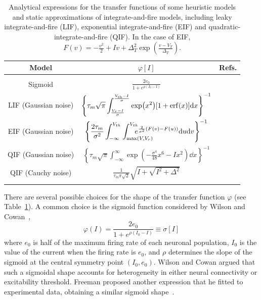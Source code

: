 \documentclass[11pt]{article}
\numberwithin{equation}{section}
\begin{document}
\begin{table}\label{table1} \small
\centering
\begingroup
{}              %
\setlength{\arrayrulewidth}{0.4pt}  %
\begin{tabular}{|c|c|c|} \hline
  \rowcolor{softblue!25}
  \textbf{\color{softblue!60!black} Model} &
  \textbf{\color{softblue!60!black} $\varphi[I]$} &
  \textbf{\color{softblue!60!black} Refs.} \\
  \hline
  & & \\  %
  Sigmoid & $\displaystyle{\frac{2e_0}{1+e^{\rho(I_0-I)}}}$ & \cite{Wilson1972,jansen1995}\\[15pt]
  LIF (Gaussian noise) & $\left\{\displaystyle{\tau_m\sqrt{\pi} \int_\frac{V_r-I}{\sigma}^\frac{V_\text{th}-I}{\sigma} \exp(x^2)[1+\erf(x)]\dd x}\right\}^{-1}$ & \cite{siegert1951,amit1997,brunel1999} \\[15pt]
  EIF (Gaussian noise) & $\displaystyle{\left\{\frac{2\tau_m}{\sigma^2}\int_{-\infty}^{V_{th}}
  \int_{\max(V,V_r)}^{V_{th}}\mkern-32mu\mkern-18mu e^{\frac{2}{\sigma^2}(F(v)-F(u))}
  \dd u \dd v \right\}^{-1} }$ & \cite{fourcaud-trocme2003,fourcaud-trocm2005} \\[15pt]
  QIF (Gaussian noise) & $\displaystyle{\left\{\tau_m\sqrt{\pi} \int_{-\infty}^\infty \exp\left(-\frac{\sigma^4}{48}x^6 - Ix^2 \right) \dd x\right\}^{-1}}$ & \cite{brunel2003a} \\[15pt]
  QIF (Cauchy noise) & $\displaystyle{\frac{1}{\tau_m\pi\sqrt{2}}}\sqrt{I+\sqrt{I^2+\Delta^2}}$ & \cite{montbrio2015,clusella2022a} \\
  & & \\ %
  \hline
\end{tabular}
\endgroup
\caption{Analytical expressions for the transfer functions of some heuristic models and 
static approximations of integrate-and-fire models, including leaky integrate-and-fire (LIF), exponential integrate-and-fire (EIF) and quadratic-integrate-and-fire (QIF). In the case
of EIF, $F(v) = -\frac{v^2}{2} + Iv + \Delta_T^2\exp\left(\frac{v-V_T}{\Delta_T}\right)$.
} \label{table:transfers}
\end{table}


There are several possible choices for the shape
of the transfer function $\varphi$ (see Table~\ref{table:transfers}). 
A common choice is the sigmoid function considered by Wilson and Cowan~\cite{Wilson1972},
\begin{equation}\label{eq:sigmoid}
\varphi(I) = \frac{2e_0}{1+e^{\rho(I_0-I)}} \equiv \sigma [I] 
\end{equation}
where $e_0$ is half of the maximum firing rate of each neuronal population, $I_0$ is the value of the current when the firing rate is $e_0$, and $\rho$ determines the slope of the sigmoid at the central symmetry point $(I_0, e_0)$.
Wilson and Cowan argued that such a sigmoidal shape accounts for heterogeneity in either neural connectivity
or excitability threshold.
Freeman proposed another expression that he fitted to experimental data,
obtaining a similar sigmoid shape~\cite{freeman1975,freeman1979}.
\end{document}
